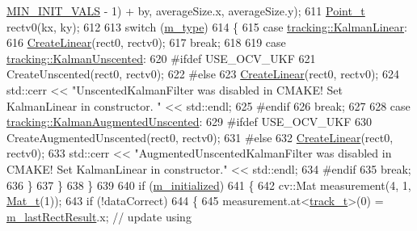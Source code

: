 \begin{DoxyCode}
      \mbox{\hyperlink{class_t_kalman_filter_a4511a3b64d2232e516b396e8783220cf}{MIN\_INIT\_VALS}} - 1) + by, averageSize.x, averageSize.y);
611             \mbox{\hyperlink{defines_8h_a8c42696da8f098b91374a8e8bb84b430}{Point\_t}} rectv0(kx, ky);
612 
613             \textcolor{keywordflow}{switch} (\mbox{\hyperlink{class_t_kalman_filter_a00cabc6683f6cc848559515df46d7101}{m\_type}})
614             \{
615             \textcolor{keywordflow}{case} \mbox{\hyperlink{namespacetracking_a83f2c4d58ea2737f7d6296dce3eb722aa889eca583e371386c92e05814797a885}{tracking::KalmanLinear}}:
616                 \mbox{\hyperlink{class_t_kalman_filter_a6b1bb8fb881f82ce0a766e6ea41f159c}{CreateLinear}}(rect0, rectv0);
617                 \textcolor{keywordflow}{break};
618 
619             \textcolor{keywordflow}{case} \mbox{\hyperlink{namespacetracking_a83f2c4d58ea2737f7d6296dce3eb722aa39d914d61ae37e52ad325f55d199dabc}{tracking::KalmanUnscented}}:
620 \textcolor{preprocessor}{#ifdef USE\_OCV\_UKF}
621                 CreateUnscented(rect0, rectv0);
622 \textcolor{preprocessor}{#else}
623                 \mbox{\hyperlink{class_t_kalman_filter_a6b1bb8fb881f82ce0a766e6ea41f159c}{CreateLinear}}(rect0, rectv0);
624                 std::cerr << \textcolor{stringliteral}{"UnscentedKalmanFilter was disabled in CMAKE! Set KalmanLinear in constructor.
      "} << std::endl;
625 \textcolor{preprocessor}{#endif}
626                 \textcolor{keywordflow}{break};
627 
628             \textcolor{keywordflow}{case} \mbox{\hyperlink{namespacetracking_a83f2c4d58ea2737f7d6296dce3eb722aa442bc8be9c68f72f1bc7952153cbf4c7}{tracking::KalmanAugmentedUnscented}}:
629 \textcolor{preprocessor}{#ifdef USE\_OCV\_UKF}
630                 CreateAugmentedUnscented(rect0, rectv0);
631 \textcolor{preprocessor}{#else}
632                 \mbox{\hyperlink{class_t_kalman_filter_a6b1bb8fb881f82ce0a766e6ea41f159c}{CreateLinear}}(rect0, rectv0);
633                 std::cerr << \textcolor{stringliteral}{"AugmentedUnscentedKalmanFilter was disabled in CMAKE! Set KalmanLinear in
       constructor."} << std::endl;
634 \textcolor{preprocessor}{#endif}
635                 \textcolor{keywordflow}{break};
636             \}
637         \}
638     \}
639 
640     \textcolor{keywordflow}{if} (\mbox{\hyperlink{class_t_kalman_filter_a5633e302e878261c8669816695f6a314}{m\_initialized}})
641     \{
642         cv::Mat measurement(4, 1, \mbox{\hyperlink{defines_8h_ab1a8d0e1d0eb73f62b8beee8a243475e}{Mat\_t}}(1));
643         \textcolor{keywordflow}{if} (!dataCorrect)
644         \{
645             measurement.at<\mbox{\hyperlink{defines_8h_a7ce9c8817b42ab418e61756f579549ab}{track\_t}}>(0) = \mbox{\hyperlink{class_t_kalman_filter_aed4818c7aac455928ef02dd03f8bfe56}{m\_lastRectResult}}.x;  \textcolor{comment}{// update using
}
\end{DoxyCode}
